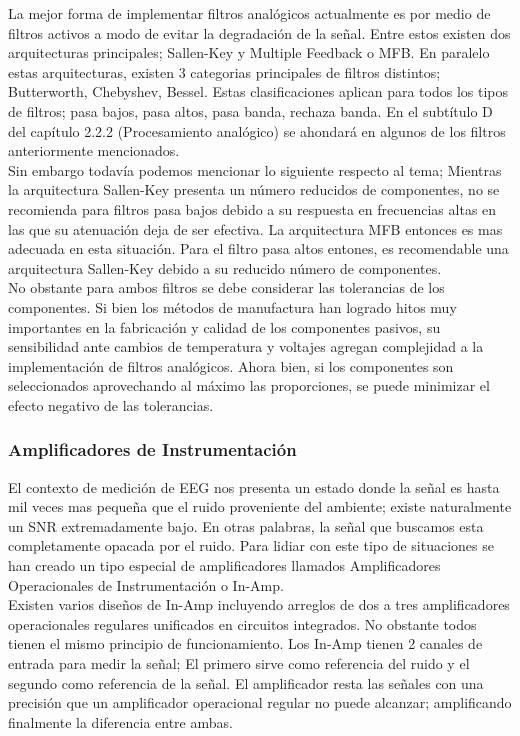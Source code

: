 La mejor forma de implementar filtros analógicos actualmente es por medio de filtros activos a modo de evitar la degradación de la señal. Entre estos existen dos arquitecturas principales; Sallen-Key y Multiple Feedback o MFB. En paralelo estas arquitecturas, existen 3 categorias principales de filtros distintos; Butterworth, Chebyshev, Bessel. Estas clasificaciones aplican para todos los tipos de filtros; pasa bajos, pasa altos, pasa banda, rechaza banda. En el subtítulo D del capítulo 2.2.2 (Procesamiento analógico) se ahondará en algunos de los filtros anteriormente mencionados.\\

Sin embargo todavía podemos mencionar lo siguiente respecto al tema; Mientras la arquitectura Sallen-Key presenta un número reducidos de componentes, no se recomienda para filtros pasa bajos debido a su respuesta en frecuencias altas en las que su atenuación deja de ser efectiva. La arquitectura MFB entonces es mas adecuada en esta situación. Para el filtro pasa altos entones, es recomendable una arquitectura Sallen-Key debido a su reducido número de componentes.\\

No obstante para ambos filtros se debe considerar las tolerancias de los componentes. Si bien los métodos de manufactura han logrado hitos muy importantes en la fabricación y calidad de los componentes pasivos, su sensibilidad ante cambios de temperatura y voltajes agregan complejidad a la implementación de filtros analógicos. Ahora bien, si los componentes son seleccionados aprovechando al máximo las proporciones, se puede minimizar el efecto negativo de las tolerancias.\\

\subsubsection{Amplificadores de Instrumentación}
\label{sec:orgaa33a78}
El contexto de medición de EEG nos presenta un estado donde la señal es hasta mil veces mas pequeña que el ruido proveniente del ambiente; existe naturalmente un SNR extremadamente bajo. En otras palabras, la señal que buscamos esta completamente opacada por el ruido. Para lidiar con este tipo de situaciones se han creado un tipo especial de amplificadores llamados Amplificadores Operacionales de Instrumentación o In-Amp.\\

Existen varios diseños de In-Amp incluyendo arreglos de dos a tres amplificadores operacionales regulares unificados en circuitos integrados. No obstante todos tienen el mismo principio de funcionamiento. Los In-Amp tienen 2 canales de entrada para medir la señal; El primero sirve como referencia del ruido y el segundo como referencia de la señal. El amplificador resta las señales con una precisión que un amplificador operacional regular no puede alcanzar; amplificando finalmente la diferencia entre ambas.\\

